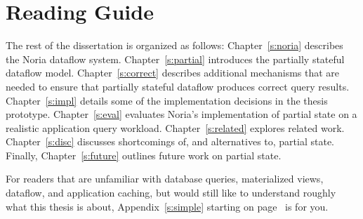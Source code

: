 \section{Reading Guide}
\label{s:read}

The rest of the dissertation is organized as follows: Chapter~\ref{s:noria}
describes the Noria dataflow system. Chapter~\ref{s:partial} introduces the
partially stateful dataflow model. Chapter~\ref{s:correct} describes additional
mechanisms that are needed to ensure that partially stateful dataflow produces
correct query results. Chapter~\ref{s:impl} details some of the implementation
decisions in the thesis prototype. Chapter~\ref{s:eval} evaluates Noria's
implementation of partial state on a realistic application query workload.
Chapter~\ref{s:related} explores related work. Chapter~\ref{s:disc} discusses
shortcomings of, and alternatives to, partial state. Finally,
Chapter~\ref{s:future} outlines future work on partial state.

For readers that are unfamiliar with database queries, materialized views,
dataflow, and application caching, but would still like to understand roughly
what this thesis is about, Appendix~\ref{s:simple} starting on
page~\pageref{s:simple} is for you.
